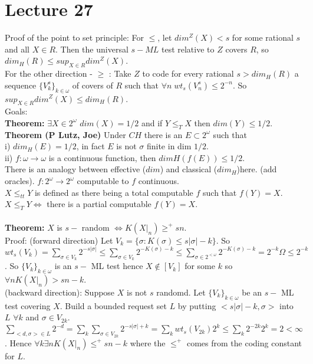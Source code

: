 \documentclass{article}
\begin{document}
  \section{Lecture 27}
  Proof of the point to set principle: For $\leq$, let $dim^Z(X) < s$ for some rational $s$ and all $X \in R$. Then the universal $s-ML$ test relative to $Z$ covers $R$, so $dim_H(R) \leq sup_{X \in R} dim^Z(X)$.\\
  For the other direction - $\geq$ : Take $Z$ to code for every rational $s > dim_H(R)$ a sequence $\{V_k^s\}_{k \in \omega}$ of covers of $R$ such that $\forall n  \; wt_s(V^s_n) \leq 2^{-n}$. So $sup_{X \in R} dim^Z(X) \leq dim_H(R)$.\\
  Goals: \\
  \textbf{Theorem:} $\exists X \in 2^\omega$ $dim(X) = 1/2$ and if $Y \leq_TX$ then $dim(Y) \leq 1/2$.\\
  \textbf{Theorem (P Lutz, Joe)} Under $CH$ there is an $E \subset 2^\omega$ such that \\i) $dim_H(E) = 1/2$, in fact $E$ is not $\sigma$ finite in dim $1/2$.\\
  ii) $f : \omega \to \omega$ is a continuous function, then $dimH(f(E)) \leq 1/2$. \\
  There is an analogy between effective ($dim$) and classical ($dim_H$)here. (add oracles). $f: 2^\omega \to 2^\omega$ computable to $f$ continuous. \\
  $X\leq_{tt} Y$ is defined as there being a total computable $f$ such that $f(Y) = X$. $X \leq_T Y \iff $ there is a partial computable $f(Y) = X$.\\\\
  \textbf{Theorem:} $X$ is $s-$ random $\iff K(X|_n) \geq^+ sn$.\\
  Proof: (forward direction) Let $V_k = \{\sigma: K(\sigma) \leq s|\sigma| - k\}$. So $wt_s(V_k) = \sum_{\sigma \in V_k} 2^{-s|\sigma|} \leq \sum_{\sigma \in V_k} 2^{-K(\sigma)-k} \leq \sum_{\sigma \in 2^{<\omega}} 2^{-K(\sigma) - k} = 2^{-k} \Omega \leq 2^{-k}$. So $\{V_k\}_{k \in \omega}$ is an $s-$ ML test hence $X \not \in [V_k]$ for some $k$ so $\forall n K(X|_n) > sn-k$.\\
  (backward direction): Suppose $X$ is not $s$ randomd. Let $\{V_k\}_{k \in \omega}$ be an $s-$ ML test covering $X$. Build a bounded request set $L$ by putting $<s|\sigma| -k,\sigma> $ into $L$ $\forall k$ and $\sigma \in V_{2k}$. 
  $\sum_{<d,\sigma> \in L} 2^{-d} = \sum_k \sum_{\sigma \in V_{2k}} 2^{-s|\sigma|+k} = \sum_k wt_s(V_{2k})2^k \leq \sum_k 2^{-2k}2^k = 2 < \infty$. Hence $\forall k \exists n K(X|_n) \leq^+ sn -k$ where the $\leq^+$ comes from the coding constant for $L$.\\
\end{document}
